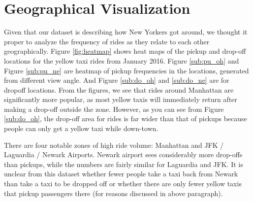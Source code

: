\documentclass{article}
\begin{document}
\section{Geographical Visualization}
Given that our dataset is describing how New Yorkers got around, we thought it proper to analyze the frequency of rides as they relate to each other geographically. Figure \ref{fig:heatmap} shows heat maps of the pickup and drop-off locations for the yellow taxi rides from January 2016. Figure \ref{sub:pu_oh} and Figure \ref{sub:pu_ne} are heatmap of pickup frequencies in the locations, generated from different view angle. And Figure \ref{sub:do_oh} and \ref{sub:do_ne} are for dropoff locations. From the figures, we see that rides around Manhattan are significantly more popular, as most yellow taxis will immediately return after making a drop-off outside the zone. However, as you can see from Figure \ref{sub:do_oh}, the drop-off area for rides is far wider than that of pickups because people can only get a yellow taxi while down-town.

There are four notable zones of high ride volume: Manhattan and JFK / Laguardia / Newark Airports. Newark airport sees considerably more drop-offs than pickups, while the numbers are fairly similar for Laguardia and JFK. It is unclear from this dataset whether fewer people take a taxi back from Newark than take a taxi to be dropped off or whether there are only fewer yellow taxis that pickup passengers there (for reasons discussed in above paragraph). 
\end{document}
